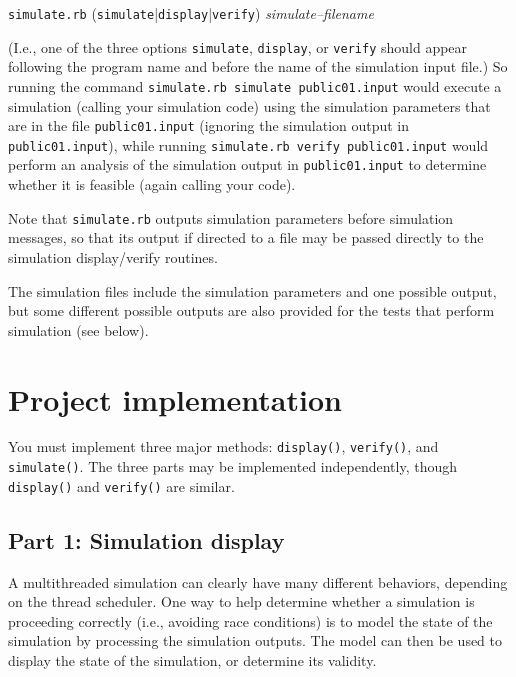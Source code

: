 \documentclass[11pt]{article}
\begin{document}
      \vspace{-2.5mm}

      \begin{center}

        \texttt{simulate.rb}
        (\texttt{simulate}|\texttt{display}|\texttt{verify})
        \emph{simulate--filename}

      \end{center}

      \vspace{-1.5mm}

    \noindent
    (I.e., one of the three options \texttt{simulate}, \texttt{display}, or
    \texttt{verify} should appear following the program name and before the
    name of the simulation input file.)  So running the command
    \texttt{simulate.rb simulate public01.input} would execute a simulation
    (calling your simulation code) using the simulation parameters that are
    in the file \texttt{public01.input} (ignoring the simulation output in
    \texttt{public01.input}), while running \texttt{simulate.rb verify
    public01.input} would perform an analysis of the simulation output in
    \texttt{public01.input} to determine whether it is feasible (again
    calling your code).

      Note that \texttt{simulate.rb} outputs simulation parameters before
    simulation messages, so that its output if directed to a file may be
    passed directly to the simulation display/verify routines.

      The simulation files include the simulation parameters and one possible
    output, but some different possible outputs are also provided for the
    tests that perform simulation (see below).

  \section{Project implementation}

    You must implement three major methods: \texttt{display()},
  \texttt{verify()}, and \texttt{simulate()}.  The three parts may be
  implemented independently, though \texttt{display()} and \texttt{verify()}
  are similar.

    \subsection{Part 1: Simulation display}

      A multithreaded simulation can clearly have many different behaviors,
    depending on the thread scheduler.  One way to help determine whether a
    simulation is proceeding correctly (i.e., avoiding race conditions) is
    to model the state of the simulation by processing the simulation
    outputs.  The model can then be used to display the state of the
    simulation, or determine its validity.
\end{document}

